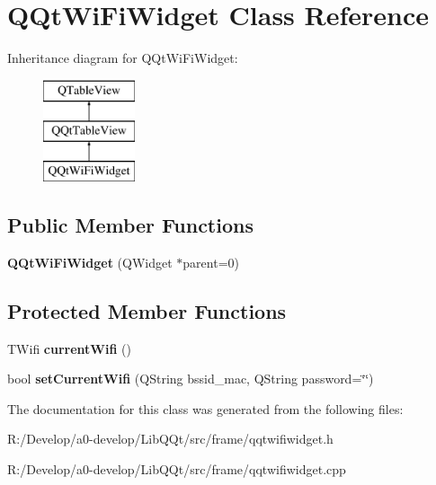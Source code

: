 \hypertarget{class_q_qt_wi_fi_widget}{}\section{Q\+Qt\+Wi\+Fi\+Widget Class Reference}
\label{class_q_qt_wi_fi_widget}
Inheritance diagram for Q\+Qt\+Wi\+Fi\+Widget\+:\begin{figure}[H]
\begin{center}
\leavevmode
\includegraphics[height=3.000000cm]{class_q_qt_wi_fi_widget}
\end{center}
\end{figure}
\subsection*{Public Member Functions}
\begin{DoxyCompactItemize}
\item 
\mbox{\label{class_q_qt_wi_fi_widget_aa64b7779b48538b28892fb5baf63f520}} 
{\bfseries Q\+Qt\+Wi\+Fi\+Widget} (Q\+Widget $\ast$parent=0)
\end{DoxyCompactItemize}
\subsection*{Protected Member Functions}
\begin{DoxyCompactItemize}
\item 
\mbox{\label{class_q_qt_wi_fi_widget_a98e781452d99b6c0a513abbc198dc971}} 
T\+Wifi {\bfseries current\+Wifi} ()
\item 
\mbox{\label{class_q_qt_wi_fi_widget_ad9a16505f84394000fa1e8cfc84d53f9}} 
bool {\bfseries set\+Current\+Wifi} (Q\+String bssid\+\_\+mac, Q\+String password=\char`\"{}\char`\"{})
\end{DoxyCompactItemize}


The documentation for this class was generated from the following files\+:\begin{DoxyCompactItemize}
\item 
R\+:/\+Develop/a0-\/develop/\+Lib\+Q\+Qt/src/frame/qqtwifiwidget.\+h\item 
R\+:/\+Develop/a0-\/develop/\+Lib\+Q\+Qt/src/frame/qqtwifiwidget.\+cpp\end{DoxyCompactItemize}
